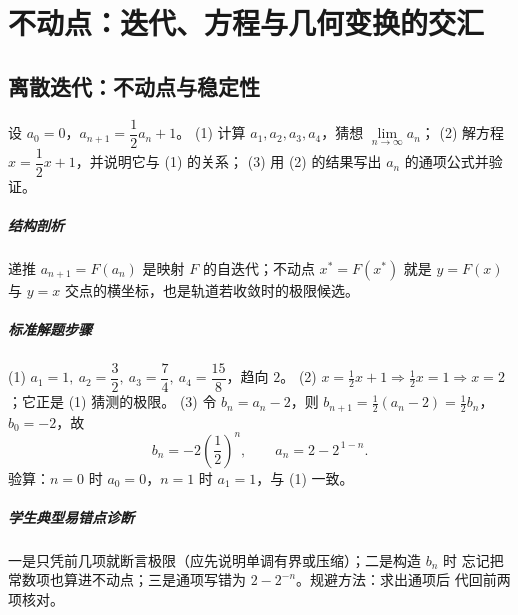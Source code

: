 \chapter{不动点：迭代、方程与几何变换的交汇}

\section{离散迭代：不动点与稳定性}

\begin{problem}
设 $a_0=0$，$a_{n+1}=\dfrac12a_n+1$。
(1) 计算 $a_1,a_2,a_3,a_4$，猜想 $\lim\limits_{n\to\infty}a_n$；
(2) 解方程 $x=\dfrac12x+1$，并说明它与 (1) 的关系；
(3) 用 (2) 的结果写出 $a_n$ 的通项公式并验证。
\end{problem}
\begin{solution}
\paragraph{结构剖析}
递推 $a_{n+1}=F(a_n)$ 是映射 $F$ 的自迭代；不动点 $x^*=F(x^*)$ 就是
$y=F(x)$ 与 $y=x$ 交点的横坐标，也是轨道若收敛时的极限候选。
\paragraph{标准解题步骤}
(1) $a_1=1,\ a_2=\dfrac32,\ a_3=\dfrac74,\ a_4=\dfrac{15}8$，趋向 $2$。
(2) $x=\frac12x+1\Rightarrow \frac12x=1\Rightarrow x=2$；它正是 (1) 猜测的极限。
(3) 令 $b_n=a_n-2$，则 $b_{n+1}=\frac12(a_n-2)=\frac12b_n$，$b_0=-2$，故
\[
  b_n=-2\left(\frac12\right)^n,\qquad a_n=2-2^{\,1-n}.
\]
验算：$n=0$ 时 $a_0=0$，$n=1$ 时 $a_1=1$，与 (1) 一致。
\paragraph{学生典型易错点诊断}
一是只凭前几项就断言极限（应先说明单调有界或压缩）；二是构造 $b_n$ 时
忘记把常数项也算进不动点；三是通项写错为 $2-2^{-n}$。规避方法：求出通项后
代回前两项核对。
\end{solution}


